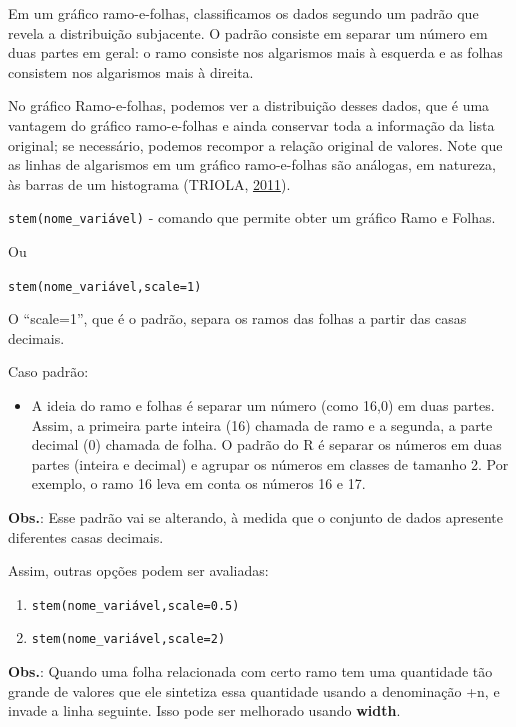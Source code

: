 \documentclass[12pt,portuguese,oneside]{book}
\providecommand{\tightlist}{%
  \setlength{\itemsep}{0pt}\setlength{\parskip}{0pt}}
\begin{document}
Em um gráfico ramo-e-folhas, classificamos os dados segundo um padrão
que revela a distribuição subjacente. O padrão consiste em separar um
número em duas partes em geral: o ramo consiste nos algarismos mais à
esquerda e as folhas consistem nos algarismos mais à direita.

No gráfico Ramo-e-folhas, podemos ver a distribuição desses dados, que é
uma vantagem do gráfico ramo-e-folhas e ainda conservar toda a
informação da lista original; se necessário, podemos recompor a relação
original de valores. Note que as linhas de algarismos em um gráfico
ramo-e-folhas são análogas, em natureza, às barras de um histograma
(TRIOLA, \protect\hyperlink{ref-triola1999}{2011}).

\texttt{stem(nome\_variável)} - comando que permite obter um gráfico
Ramo e Folhas.

Ou

\texttt{stem(nome\_variável,scale=1)}

O ``scale=1'', que é o padrão, separa os ramos das folhas a partir das
casas decimais.

Caso padrão:

\begin{itemize}
\tightlist
\item
  A ideia do ramo e folhas é separar um número (como 16,0) em duas
  partes. Assim, a primeira parte inteira (16) chamada de ramo e a
  segunda, a parte decimal (0) chamada de folha. O padrão do R é separar
  os números em duas partes (inteira e decimal) e agrupar os números em
  classes de tamanho 2. Por exemplo, o ramo 16 leva em conta os números
  16 e 17.
\end{itemize}

\textbf{Obs.}: Esse padrão vai se alterando, à medida que o conjunto de
dados apresente diferentes casas decimais.

Assim, outras opções podem ser avaliadas:

\begin{enumerate}
\def\labelenumi{\alph{enumi})}
\item
  \texttt{stem(nome\_variável,scale=0.5)}
\item
  \texttt{stem(nome\_variável,scale=2)}
\end{enumerate}

\textbf{Obs.}: Quando uma folha relacionada com certo ramo tem uma
quantidade tão grande de valores que ele sintetiza essa quantidade
usando a denominação +n, e invade a linha seguinte. Isso pode ser
melhorado usando \textbf{width}.
\end{document}
